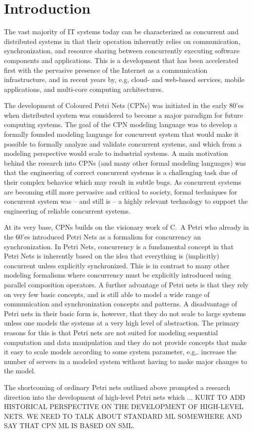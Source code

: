 \section{Introduction}

The vast majority of IT systems today can be characterized as
concurrent and distributed systems in that their operation inherently
relies on communication, synchronization, and resource sharing between
concurrently executing software components and applications. This is a
development that has been accelerated first with the pervasive
presence of the Internet as a communication infrastructure, and in
recent years by, e.g, cloud- and web-based services, mobile
applications, and multi-core computing architectures.


The development of Coloured Petri Nets (CPNs) was initiated in the
early 80'es when distributed system was considered to become a major
paradigm for future computing systems. The goal of the CPN modeling
language was to develop a formally founded modeling language for
concurrent system that would make it possible to formally analyze and
validate concurrent systems, and which from a modeling perspective
would scale to industrial systems. A main motivation behind the
research into CPNs (and many other formal modeling languages) was
that the engineering of correct concurrent systems is a challenging
task due of their complex behavior which may result in subtle bugs. As
concurrent systems are becoming still more pervasive and critical to
society, formal techniques for concurrent system was -- and still is
-- a highly relevant technology to support the engineering of reliable
concurrent systems.


At its very base, CPNs builds on the visionary work of C.~A Petri
\cite{X} who already in the 60'es introduced Petri Nets as a formalism
for concurrency an synchronization. In Petri Nets, concurrency is a
fundamental concept in that Petri Nets is inherently based on the idea
that everything is (implicitly) concurrent unless explicitly
synchronized. This is in contrast to many other modeling formalisms
where concurrency must be explicitly introduced using parallel
composition operators. A further advantage of Petri nets is that they
rely on very few basic concepts, and is still able to model a wide
range of communication and synchronization concepts and patterns. A
disadvantage of Petri nets in their basic form is, however, that they
do not scale to large systems unless one models the systems at a very
high level of abstraction. The primary reasons for this is that Petri
nets are not suited for modeling sequential computation and data
manipulation and they do not provide concepts that make it easy to
scale models according to some system parameter, e.g,. increase the
number of servers in a modeled system without having to make major
changes to the model.

The shortcoming of ordinary Petri nets outlined above prompted a
research direction into the development of high-level Petri nets which
... KURT TO ADD HISTORICAL PERSPECTIVE ON THE DEVELOPMENT OF
HIGH-LEVEL NETS. WE NEED TO TALK ABOUT STANDARD ML SOMEWHERE AND SAY
THAT CPN ML IS BASED ON SML.
